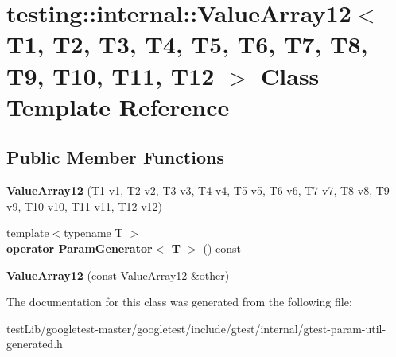 \hypertarget{classtesting_1_1internal_1_1ValueArray12}{}\section{testing\+:\+:internal\+:\+:Value\+Array12$<$ T1, T2, T3, T4, T5, T6, T7, T8, T9, T10, T11, T12 $>$ Class Template Reference}
\label{classtesting_1_1internal_1_1ValueArray12}
\subsection*{Public Member Functions}
\begin{DoxyCompactItemize}
\item 
\mbox{\label{classtesting_1_1internal_1_1ValueArray12_aaebe12df41b8122fd03f5d6aa1c820a7}} 
{\bfseries Value\+Array12} (T1 v1, T2 v2, T3 v3, T4 v4, T5 v5, T6 v6, T7 v7, T8 v8, T9 v9, T10 v10, T11 v11, T12 v12)
\item 
\mbox{\label{classtesting_1_1internal_1_1ValueArray12_acc840a1c32a10ce160731d66c8105e0b}} 
{\footnotesize template$<$typename T $>$ }\\{\bfseries operator Param\+Generator$<$ T $>$} () const
\item 
\mbox{\label{classtesting_1_1internal_1_1ValueArray12_a901c95791c3b16ca51fcd7fc1323fef2}} 
{\bfseries Value\+Array12} (const \hyperlink{classtesting_1_1internal_1_1ValueArray12}{Value\+Array12} \&other)
\end{DoxyCompactItemize}


The documentation for this class was generated from the following file\+:\begin{DoxyCompactItemize}
\item 
test\+Lib/googletest-\/master/googletest/include/gtest/internal/gtest-\/param-\/util-\/generated.\+h\end{DoxyCompactItemize}
